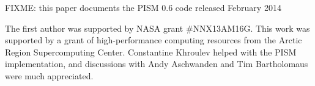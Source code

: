 \documentclass[gmd]{copernicus}   %
\begin{document}
FIXME: this paper documents the PISM 0.6 code released February 2014


\begin{acknowledgements}
The first author was supported by NASA grant \#NNX13AM16G.  This work was supported by a grant of high-performance computing resources from the Arctic Region Supercomputing Center.  Constantine Khroulev helped with the PISM implementation, and discussions with Andy Aschwanden and Tim Bartholomaus were much appreciated.
\end{acknowledgements}



\end{document}
